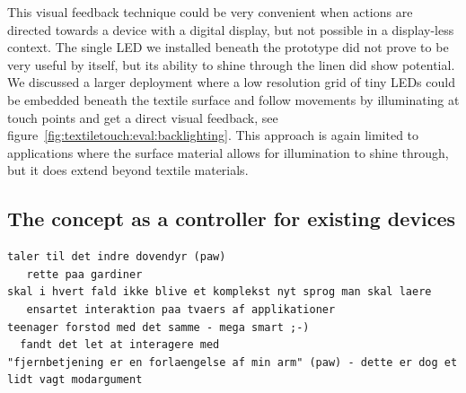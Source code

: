 This visual feedback technique could be very convenient when actions are directed towards a device with a digital display, but not possible in a display-less context.
The single LED we installed beneath the prototype did not prove to be very useful by itself, but its ability to shine through the linen did show potential.
We discussed a larger deployment where a low resolution grid of tiny LEDs could be embedded beneath the textile surface and follow movements by illuminating at touch points and get a direct visual feedback, see figure~\ref{fig:textiletouch:eval:backlighting}.
This approach is again limited to applications where the surface material allows for illumination to shine through, but it does extend beyond textile materials.

\subsection{The concept as a controller for existing devices}
\todo{\dots}
\blank
\begin{verbatim}
taler til det indre dovendyr (paw)
   rette paa gardiner
skal i hvert fald ikke blive et komplekst nyt sprog man skal laere
   ensartet interaktion paa tvaers af applikationer
teenager forstod med det samme - mega smart ;-)
  fandt det let at interagere med
"fjernbetjening er en forlaengelse af min arm" (paw) - dette er dog et lidt vagt modargument
\end{verbatim}

